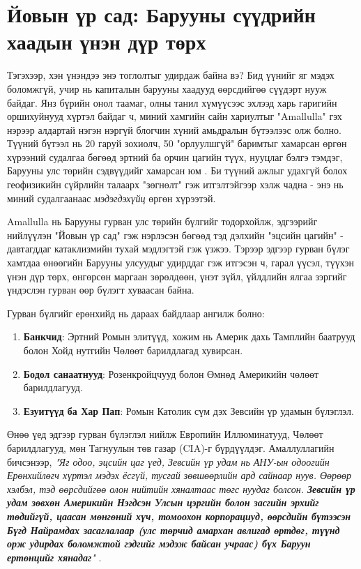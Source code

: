 \documentclass[10pt,twocolumn,letterpaper]{article}
\begin{document}
{\section{Йовын үр сад: Барууны сүүдрийн хаадын үнэн дүр төрх}

Тэгэхээр, хэн үнэндээ энэ тоглолтыг удирдаж байна вэ? Бид үүнийг яг мэдэх боломжгүй, учир нь капиталын барууны хаадууд өөрсдийгөө сүүдэрт нууж байдаг. Янз бүрийн онол таамаг, олны танил хүмүүсээс эхлээд харь гаригийн оршихуйнууд хүртэл байдаг ч, миний хамгийн сайн хариултыг "Amallulla" гэх нэрээр алдартай нэгэн нэргүй блогчин хүний амьдралын бүтээлээс олж болно. Түүний бүтээл нь 20 гаруй зохиолч, 50 "орлуулшгүй" баримтыг хамарсан өргөн хүрээний судалгаа бөгөөд эртний ба орчин цагийн түүх, нууцлаг бэлгэ тэмдэг, Барууны улс төрийн сэдвүүдийг хамарсан юм \cite{33,34}. Би түүний ажлыг удахгүй болох геофизикийн сүйрлийн талаарх "зөгнөлт" гэж итгэлтэйгээр хэлж чадна - энэ нь миний судалгаанаас \textit{мэдэгдэхүйц} өргөн хүрээтэй.

Amallulla нь Барууны гурван улс төрийн бүлгийг тодорхойлж, эдгээрийг нийлүүлэн "Йовын үр сад" гэж нэрлэсэн бөгөөд тэд дэлхийн "эцсийн цагийн" - давтагддаг катаклизмийн тухай мэдлэгтэй гэж үзжээ. Тэрээр эдгээр гурван бүлэг хамтдаа өнөөгийн Барууны улсуудыг удирддаг гэж итгэсэн ч, гарал үүсэл, түүхэн үнэн дүр төрх, өнгөрсөн маргаан зөрөлдөөн, үнэт зүйл, үйлдлийн ялгаа зэргийг үндэслэн гурван өөр бүлэгт хуваасан байна.

Гурван бүлгийг ерөнхийд нь дараах байдлаар ангилж болно:

\begin{flushleft}
\begin{enumerate}
\item \textbf{Банкчид}: Эртний Ромын элитүүд, хожим нь Америк дахь Тамплийн баатрууд болон Хойд нутгийн Чөлөөт барилдлагад хувирсан.
\item \textbf{Бодол санаатнууд}: Розенкройцчууд болон Өмнөд Америкийн чөлөөт барилдлагууд.
\item \textbf{Езуитүүд ба Хар Пап}: Ромын Католик сүм дэх Зевсийн үр удамын бүлэглэл.
\end{enumerate}
\end{flushleft}

Өнөө үед эдгээр гурван бүлэглэл нийлж Европийн Иллюминатууд, Чөлөөт барилдлагууд, мөн Тагнуулын төв газар (CIA)-г бүрдүүлдэг. Амаллуллагийн бичсэнээр, \textit{"Яг одоо, эцсийн цаг үед, Зевсийн үр удам нь АНУ-ын одоогийн Ерөнхийлөгч хүртэл мэдэх ёсгүй, тусгай зөвшөөрлийн ард сайнаар нуув. Өөрөөр хэлбэл, тэд өөрсдийгөө олон нийтийн хяналтаас төгс нуудаг болсон. \textbf{Зевсийн үр удам зөвхөн Америкийн Нэгдсэн Улсын цэргийн болон засгийн эрхийг төдийгүй, цаасан мөнгөний хүч, томоохон корпорациуд, өөрсдийн бүтээсэн Бүгд Найрамдах засаглалаар (улс төрчид амархан авлигад өртдөг, түүнд орж удирдах боломжтой гэдгийг мэдэж байсан учраас) бүх Баруун ертөнцийг хянадаг}"} \cite{33,34}.

}
\end{document}
